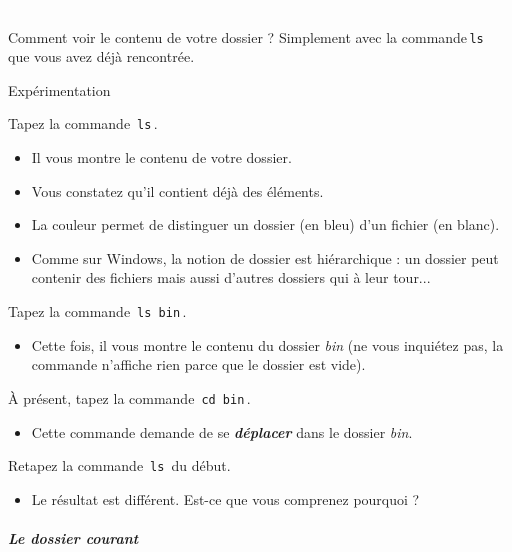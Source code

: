 \documentclass[a4paper,11pt]{article}
\begin{document}
\textcolor{white}{.} \par
				
\par
        
Comment voir le contenu de votre dossier ? Simplement avec la commande\,\verb|ls|\, que vous avez d\'ej\`a rencontr\'ee.
				
\par

\begin{Tutoriel}{Exp\'erimentation}  
\begin{steps}
\item Tapez la commande \,\verb|ls|\,.
\end{steps}				
\par
        
\begin{itemize}
\item Il vous montre le contenu de votre dossier.
\item Vous constatez qu'il contient d\'ej\`a des \'el\'ements.
\item La couleur permet de distinguer un dossier (en bleu) d'un fichier (en blanc).
\item Comme sur Windows, la notion de dossier est hi\'erarchique : un dossier peut contenir des fichiers mais aussi d'autres dossiers qui \`a leur tour...
\end{itemize}
				
\begin{steps}
\item Tapez la commande \,\verb|ls bin|\,.
\end{steps}
				
\par
\begin{itemize}
\item Cette fois, il vous montre le contenu du dossier \textit{bin} (ne vous inqui\'etez pas, la commande n'affiche rien parce que le dossier est vide).
\end{itemize}
\begin{steps}
\item	 \`A pr\'esent, tapez la commande \,\verb|cd bin|\,.
\end{steps}				
\par
        
\begin{itemize}
\item Cette commande demande de se \textit{\textbf{d\'eplacer}} dans le dossier \textit{bin}.
\end{itemize}
\begin{steps}
\item	Retapez la commande	\,\verb|ls|\, du d\'ebut.
\end{steps}
 \par
 \begin{itemize}
\item Le r\'esultat est diff\'erent. Est-ce que vous comprenez pourquoi ?
\end{itemize}
\end{Tutoriel}
\subparagraph{Le dossier courant} 
		
\end{document}
